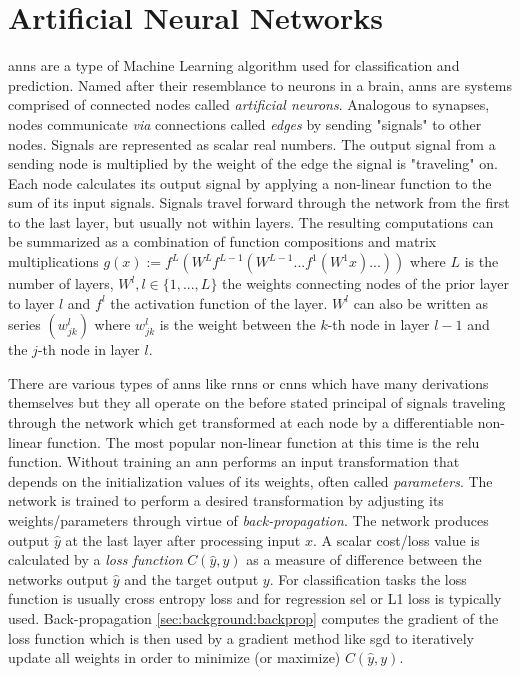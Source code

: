 \section{Artificial Neural Networks} \label{sec:background:ann}

\glspl{ann} are a type of Machine Learning algorithm used for classification and prediction. Named after their resemblance to neurons in a brain, \glspl{ann} are systems comprised of connected nodes called \textit{artificial neurons}. Analogous to synapses, nodes communicate \textit{via} connections called \textit{edges} by sending "signals" to other nodes. Signals are represented as scalar real numbers. The output signal from a sending node is multiplied by the weight of the edge the signal is "traveling" on. Each node calculates its output signal by applying a non-linear function to the sum of its input signals. Signals travel forward through the network from the first to the last layer, but usually not within layers. The resulting computations can be summarized as a combination of function compositions and matrix multiplications $g(x) := f^L(W^Lf^{L-1}(W^{L-1}...f^1(W^1x)...))$ where $L$ is the number of layers, $W^l, l \in \{1,...,L\}$ the weights connecting nodes of the prior layer to layer $l$ and $f^l$ the activation function of the layer. $W^l$ can also be written as series $(w^l_{jk})$ where $w^l_{jk}$ is the weight between the $k$-th node in layer $l-1$ and the $j$-th node in layer $l$. \par There are various types of \glspl{ann} like \glspl{rnn} or \glspl{cnn} which have many derivations themselves but they all operate on the before stated principal of signals traveling through the network which get transformed at each node by a differentiable non-linear function. The most popular non-linear function at this time is the \gls{relu} function. Without training an \gls{ann} performs an input transformation that depends on the initialization values of its weights, often called \textit{parameters}. The network is trained to perform a desired transformation by adjusting its weights/parameters through virtue of \textit{back-propagation}. The network produces output $\hat{y}$ at the last layer after processing input $x$. A scalar cost/loss value is calculated by a \textit{loss function} $C(\hat{y}, y)$ as a measure of difference between the networks output $\hat{y}$ and the target output $y$. For classification tasks the loss function is usually cross entropy loss  and for regression \gls{sel} or L1 loss is typically used. Back-propagation \ref{sec:background:backprop} computes the gradient of the loss function which is then used by a gradient method like \gls{sgd} to iteratively update all weights in order to minimize (or maximize) $C(\hat{y}, y)$. 

